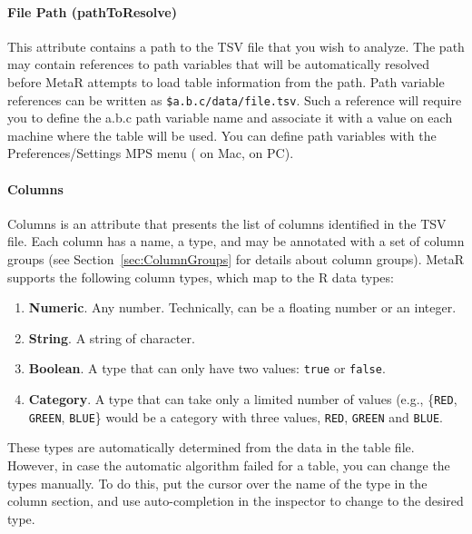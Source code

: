 \paragraph{File Path (pathToResolve)}
This attribute contains a path to the TSV file that you wish to analyze. The path may contain references to path variables that will be automatically resolved before MetaR attempts to load table information from the path. Path variable references can be written as \texttt{\${a.b.c}/data/file.tsv}. Such a reference will require you to define the a.b.c path variable name and associate it with a value on each machine where the table will be used. You can define path variables with the Preferences/Settings MPS menu ( on Mac,  on PC).

\paragraph{Columns}
Columns is an attribute that presents the list of columns identified in the TSV file. Each column has a name, a type, and may be annotated with a set of column groups (see Section~\ref{sec:ColumnGroups} for details about column groups).
MetaR supports the following column types, which map to the R data types:
\begin{enumerate}
	\item \textbf{Numeric}. Any number. Technically, can be a floating number or an integer.
	\item \textbf{String}. A string of character.
	\item \textbf{Boolean}. A type that can only have two values: \texttt{true} or \texttt{false}.
	\item \textbf{Category}. A type that can take only a limited number of values (e.g., \{\texttt{RED}, \texttt{GREEN}, \texttt{BLUE}\} would be a category with three values, \texttt{RED}, \texttt{GREEN} and \texttt{BLUE}.
\end{enumerate}
These types are automatically determined from the data in the table file. However, in case the automatic algorithm failed for a table, you can change the types manually. To do this, put the cursor over the name of the type in the column section, and use auto-completion in the inspector to change to the desired type.
 
